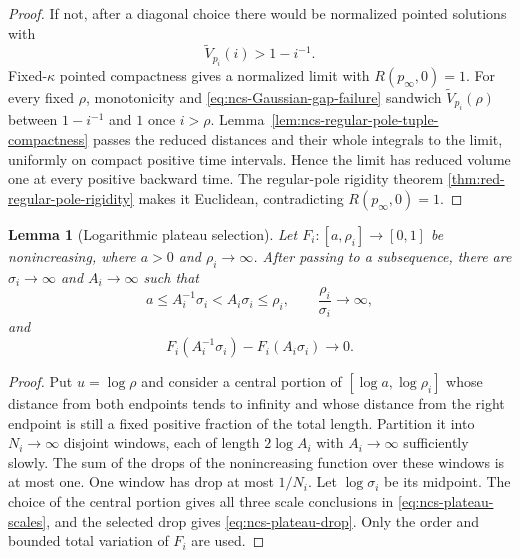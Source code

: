 \documentclass[10pt]{coll-l}
\newtheorem{lemma}[theorem]{Lemma}
\theoremstyle{definition}
\theoremstyle{remark}
\numberwithin{section}{chapter}
\numberwithin{equation}{chapter}
\begin{document}
\begin{proof}
If not, after a diagonal choice there would be normalized pointed solutions
with
\begin{equation}
                         \widetilde V_{p_i}(i)>1-i^{-1}.\label{eq:ncs-Gaussian-gap-failure}
\end{equation}
Fixed-$\kappa$ pointed compactness gives a normalized limit with
$R(p_\infty,0)=1$.  For every fixed $\rho$, monotonicity and
\eqref{eq:ncs-Gaussian-gap-failure} sandwich
$\widetilde V_{p_i}(\rho)$ between $1-i^{-1}$ and $1$ once $i>\rho$.
Lemma~\ref{lem:ncs-regular-pole-tuple-compactness} passes the reduced
distances and their whole integrals to the limit, uniformly on compact
positive time intervals.  Hence the limit has reduced volume one at every
positive backward time.  The regular-pole rigidity theorem
\ref{thm:red-regular-pole-rigidity} makes it Euclidean, contradicting
$R(p_\infty,0)=1$.
\end{proof}

\begin{lemma}[Logarithmic plateau selection]
\label{lem:ncs-logarithmic-plateau}
Let $F_i:[a,\rho_i]\to[0,1]$ be nonincreasing, where $a>0$ and
$\rho_i\to\infty$.  After passing to a subsequence, there are
$\sigma_i\to\infty$ and $A_i\to\infty$ such that
\begin{equation}
 a\leq A_i^{-1}\sigma_i<A_i\sigma_i\leq\rho_i,\qquad
 \frac{\rho_i}{\sigma_i}\longrightarrow\infty,        \label{eq:ncs-plateau-scales}
\end{equation}
and
\begin{equation}
 F_i(A_i^{-1}\sigma_i)-F_i(A_i\sigma_i)\longrightarrow0. \label{eq:ncs-plateau-drop}
\end{equation}
\end{lemma}

\begin{proof}
Put $u=\log\rho$ and consider a central portion of
$[\log a,\log\rho_i]$ whose distance from both endpoints tends to infinity
and whose distance from the right endpoint is still a fixed positive
fraction of the total length.  Partition it into $N_i\to\infty$ disjoint
windows, each of length $2\log A_i$ with $A_i\to\infty$ sufficiently
slowly.  The sum of the drops of the nonincreasing function over these
windows is at most one.  One window has drop at most $1/N_i$.  Let
$\log\sigma_i$ be its midpoint.  The choice of the central portion gives
all three scale conclusions in \eqref{eq:ncs-plateau-scales}, and the
selected drop gives \eqref{eq:ncs-plateau-drop}.  Only the order and bounded
total variation of $F_i$ are used.
\end{proof}
\end{document}
